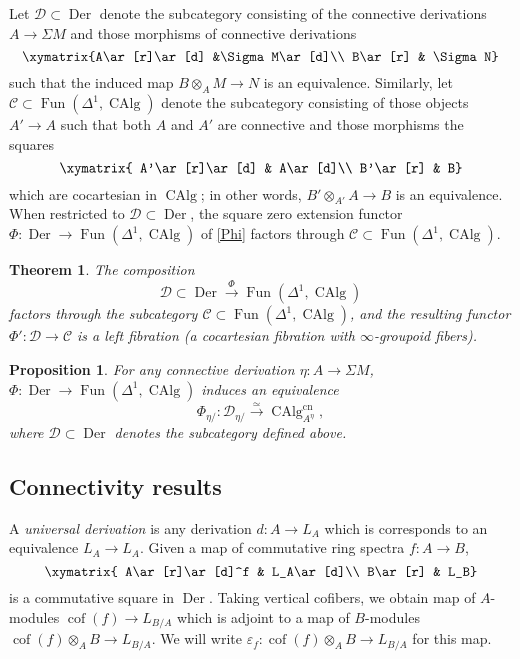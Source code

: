 \documentclass{article}
\newtheorem{theorem}{Theorem}[subsection]
\newtheorem{proposition}{Proposition}[subsection]
\theoremstyle{definition}
\newcommand{\C}{\mathcal{C}}
\newcommand{\D}{\mathcal{D}}
\renewcommand{\i}{\infty}
\newcommand{\too}{\longrightarrow}
\DeclareMathOperator{\CAlg}{CAlg}
\DeclareMathOperator{\cof}{cof}
\DeclareMathOperator{\Der}{Der}
\DeclareMathOperator{\Fun}{Fun}
\newcommand{\cn}{\mathrm{cn}}
\renewcommand{\epsilon}{\varepsilon}
\begin{document}
Let $\D\subset\Der$ denote the subcategory consisting of the connective derivations $A\to\Sigma M$ and those morphisms of connective derivations
\[
\xymatrix{A\ar[r]\ar[d] &\Sigma M\ar[d]\\
B\ar[r] & \Sigma N}
\]
such that the induced map $B\otimes_A M\to N$ is an equivalence.
Similarly, let $\C\subset\Fun(\Delta^1,\CAlg)$ denote the subcategory consisting of those objects $A'\to A$ such that both $A$ and $A'$ are connective and those morphisms the squares
\[
\xymatrix{
A'\ar[r]\ar[d] & A\ar[d]\\
B'\ar[r] & B}
\]
which are cocartesian in $\CAlg$; in other words, $B'\otimes_{A'} A\to B$ is an equivalence.
When restricted to $\D\subset\Der$, the square zero extension functor $\Phi:\Der\to\Fun(\Delta^1,\CAlg)$ of \autoref{Phi} factors through $\C\subset\Fun(\Delta^1,\CAlg)$.
\begin{theorem}{\em \cite[Theorem 7.4.2.7]{HA}}\label{thm:lf}
The composition
\[
\D\subset\Der\overset{\Phi}{\too}\Fun(\Delta^1,\CAlg)
\]
factors through the subcategory $\C\subset\Fun(\Delta^1,\CAlg)$, and the resulting functor $\Phi':\D\to\C$ is a left fibration (a cocartesian fibration with $\i$-groupoid fibers).
\end{theorem}


\begin{proposition}{\em \cite[Proposition 7.4.2.5]{HA}}\label{prop:key}
For any connective derivation $\eta:A\to\Sigma M$,
$\Phi:\Der\to\Fun(\Delta^1,\CAlg)$ induces an equivalence
\[
\Phi_{\eta/}:\D_{\eta/}\overset{\simeq}{\too}\CAlg^{\cn}_{A^\eta},
\]
where $\D\subset\Der$ denotes the subcategory defined above.
\end{proposition}


\subsection{Connectivity results}


A {\em universal derivation}
is any derivation $d:A\to L_A$ which is corresponds to an equivalence $L_A\to L_A$.
Given a map of commutative ring spectra $f:A\to B$,
\[
\xymatrix{
A\ar[r]\ar[d]^f & L_A\ar[d]\\
B\ar[r] & L_B}
\]
is a commutative square in $\Der$.
Taking vertical cofibers, we obtain map of $A$-modules $\cof(f)\to L_{B/A}$ which is adjoint to a map of $B$-modules $\cof(f)\otimes_A B\to L_{B/A}$.
We will write $\epsilon_f:\cof(f)\otimes_A B\to L_{B/A}$ for this map.
\end{document}

